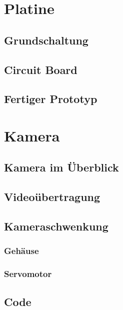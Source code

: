 \documentclass[ngerman,12pt,a4paper]{article}
\begin{document}
	\section{Platine}
	
		\subsection{Grundschaltung} %
		
		\subsection{Circuit Board} %
		
		\subsection{Fertiger Prototyp} %
	
	\newpage
	\section{Kamera}
	
		\subsection{Kamera im Überblick} %
		

		
		
		
		\subsection{Videoübertragung} %
		
		\subsection{Kameraschwenkung} %
		
			\subsubsection{Gehäuse} %
			
			\subsubsection{Servomotor} %
	
		\subsection{Code} %
		
\end{document}
